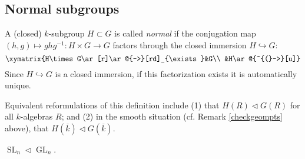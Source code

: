 \documentclass[10pt]{article}
\makeatletter
\newcommand{\nsg}{\vartriangleleft}
\newcommand{\GL}{\operatorname{GL}}
\newcommand{\SL}{\operatorname{SL}}
\renewcommand{\(}{\left(}
\renewcommand{\)}{\right)}
\renewcommand{\bar}{\overline}
\newcommand{\into}{\hookrightarrow}
\newcommand{\xycof}{\ar@{^{(}->}}
\numberwithin{thm}{subsection}
\makeatother
\begin{document}
\subsection{Normal subgroups}
\begin{defn}
A (closed) $k$-subgroup $H\subset G$ is called \textit{normal}
if the conjugation map $(h,g)\mapsto ghg^{-1}:H\times G\to G$
factors through the closed immersion $H\into G$:
\[\xymatrix{H\times G\ar[r]\ar@{-->}[rd]_{\exists}&G\\
&H\xycof[u]}\]
Since $H\into G$ is a closed immersion, if this factorization exists it is
automatically unique.
\end{defn}
Equivalent reformulations of this definition include
(1) that $H(R)\nsg G(R)$ for all $k$-algebras $R$;
and (2) in the smooth situation (cf. Remark \ref{checkgeompts} above), that $H(\bar k)\nsg G(\bar k)$.
\begin{ex}
$\SL_n\nsg \GL_n$.
\end{ex}
\end{document}
